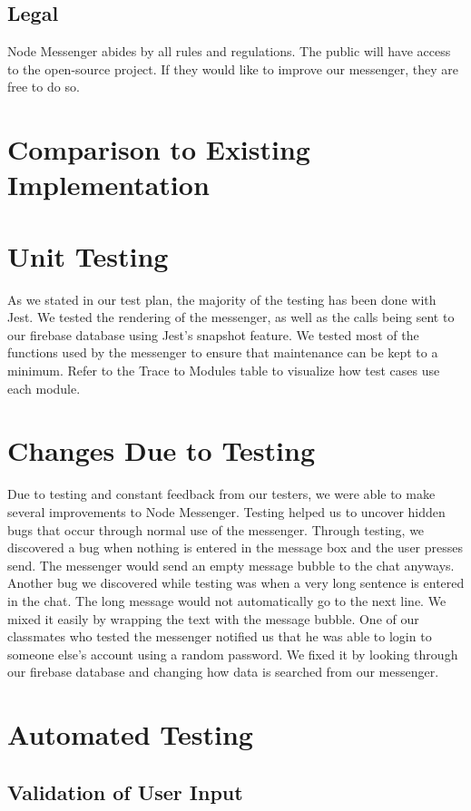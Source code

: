 \documentclass[12pt, titlepage]{article}
\begin{document}
	\subsection{Legal}
	Node Messenger abides by all rules and regulations. The public will have access to the open-source project. If they would like to improve our messenger, they are free to do so.  
	
\section{Comparison to Existing Implementation}	

\section{Unit Testing}
As we stated in our test plan, the majority of the testing has been done with Jest. We tested the rendering of the messenger, as well as the calls being sent to our firebase database using Jest’s snapshot feature. We tested most of the functions used by the messenger to ensure that maintenance can be kept to a minimum. Refer to the Trace to Modules table to visualize how test cases use each module.

\section{Changes Due to Testing}
Due to testing and constant feedback from our testers, we were able to make several improvements to Node Messenger. Testing helped us to uncover hidden bugs that occur through normal use of the messenger. Through testing, we discovered a bug when nothing is entered in the message box and the user presses send. The messenger would send an empty message bubble to the chat anyways. Another bug we discovered while testing was when a very long sentence is entered in the chat. The long message would not automatically go to the next line. We mixed it easily by wrapping the text with the message bubble. One of our classmates who tested the messenger notified us that he was able to login to someone else’s account using a random password. We fixed it by looking through our firebase database and changing how data is searched from our messenger. 

\section{Automated Testing}
\subsection{Validation of User Input}
\end{document}
